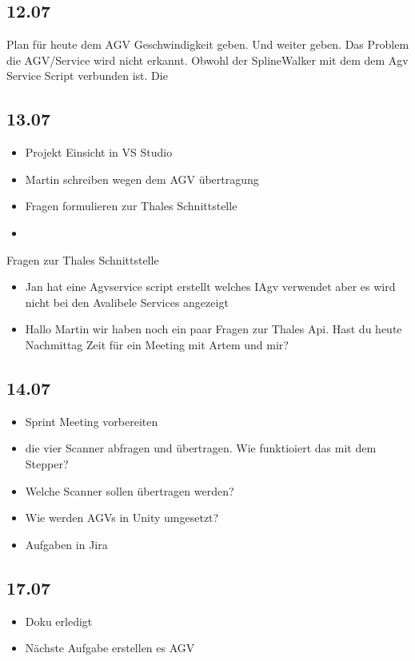 \subsection{12.07}
Plan für heute dem AGV Geschwindigkeit geben. Und weiter geben. Das Problem die AGV/Service wird nicht erkannt. Obwohl der SplineWalker mit dem dem Agv Service Script verbunden ist. Die 

\subsection{13.07}
\begin{itemize}
\item Projekt Einsicht in VS Studio
\item Martin schreiben wegen dem AGV übertragung
\item Fragen formulieren zur Thales Schnittstelle
\item 
\end{itemize}

Fragen zur Thales Schnittstelle
\begin{itemize}
\item Jan hat eine Agvservice script erstellt welches IAgv verwendet aber es wird nicht bei den Avalibele Services angezeigt
\item Hallo Martin wir haben noch ein paar Fragen zur Thales Api. Hast du heute Nachmittag Zeit für ein Meeting mit Artem und mir?
\end{itemize}

\subsection{14.07}
\begin{itemize}
\item Sprint Meeting vorbereiten
\item die vier Scanner abfragen und übertragen. Wie funktioiert das mit dem Stepper?
\item Welche Scanner sollen übertragen werden?
\item Wie werden AGVs in Unity umgesetzt?
\item Aufgaben in Jira 
\end{itemize}

\subsection{17.07}
\begin{itemize}
\item Doku erledigt
\item Nächste Aufgabe erstellen es AGV
\end{itemize}


